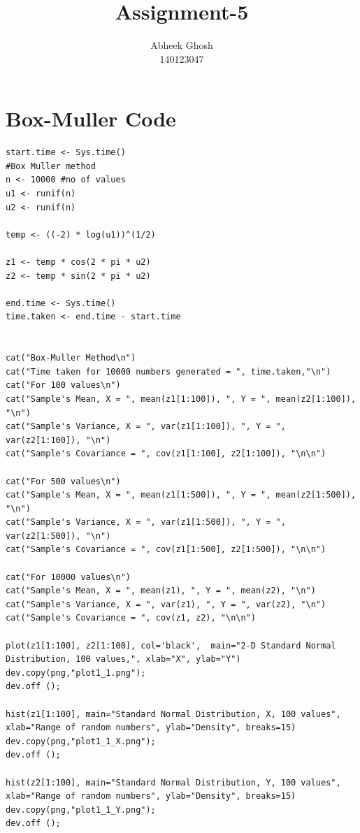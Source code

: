 \documentclass{article}
\begin{document}
	\title{\textbf{Assignment-5}}
	\author{Abheek Ghosh \\ 
		140123047 }
	
	\maketitle
	

\section{Box-Muller Code}


\begin{lstlisting}
start.time <- Sys.time()
#Box Muller method
n <- 10000 #no of values
u1 <- runif(n)
u2 <- runif(n)

temp <- ((-2) * log(u1))^(1/2)

z1 <- temp * cos(2 * pi * u2)
z2 <- temp * sin(2 * pi * u2)

end.time <- Sys.time()
time.taken <- end.time - start.time


cat("Box-Muller Method\n")
cat("Time taken for 10000 numbers generated = ", time.taken,"\n")
cat("For 100 values\n")
cat("Sample's Mean, X = ", mean(z1[1:100]), ", Y = ", mean(z2[1:100]), "\n")
cat("Sample's Variance, X = ", var(z1[1:100]), ", Y = ", var(z2[1:100]), "\n")
cat("Sample's Covariance = ", cov(z1[1:100], z2[1:100]), "\n\n")

cat("For 500 values\n")
cat("Sample's Mean, X = ", mean(z1[1:500]), ", Y = ", mean(z2[1:500]), "\n")
cat("Sample's Variance, X = ", var(z1[1:500]), ", Y = ", var(z2[1:500]), "\n")
cat("Sample's Covariance = ", cov(z1[1:500], z2[1:500]), "\n\n")

cat("For 10000 values\n")
cat("Sample's Mean, X = ", mean(z1), ", Y = ", mean(z2), "\n")
cat("Sample's Variance, X = ", var(z1), ", Y = ", var(z2), "\n")
cat("Sample's Covariance = ", cov(z1, z2), "\n\n")

plot(z1[1:100], z2[1:100], col='black',  main="2-D Standard Normal Distribution, 100 values,", xlab="X", ylab="Y")
dev.copy(png,"plot1_1.png");
dev.off ();

hist(z1[1:100], main="Standard Normal Distribution, X, 100 values", xlab="Range of random numbers", ylab="Density", breaks=15)
dev.copy(png,"plot1_1_X.png");
dev.off ();

hist(z2[1:100], main="Standard Normal Distribution, Y, 100 values", xlab="Range of random numbers", ylab="Density", breaks=15)
dev.copy(png,"plot1_1_Y.png");
dev.off ();




\end{lstlisting}
\end{document}
